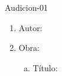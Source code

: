 \begin{defproblem}{Audicion-01}
\begin{ejercicio}[]
	\begin{enumerate}[1.-]
        \vspace*{0.3cm}
		\item
			Autor: \dotfill
			\vspace*{0.3cm}
		\item
			Obra:
			\begin{enumerate}[a)]
                \item Título: \dotfill
			    \begin{multicols}{2}


\end{multicols}
\end{enumerate}
\end{enumerate}
\end{ejercicio}
\end{defproblem}
